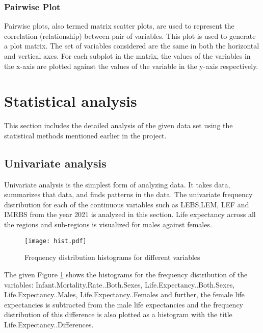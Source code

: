 \documentclass[12 pt]{scrartcl}
\begin{document}
	\subsubsection{Pairwise Plot}
	Pairwise plots, also termed matrix scatter plots, are used to represent the correlation (relationship) between pair of variables. This plot is used to generate a plot matrix. The set of variables considered are the same in both the horizontal and vertical axes. For each subplot in the matrix, the values of the variables in the x-axis are plotted against the values of the variable in the y-axis respectively.
	
	
	
	
	
	
	
	\section{Statistical analysis}
	
	This section includes the detailed analysis of the given data set using the statistical methods mentioned earlier in the project.
	
	\subsection{ Univariate analysis}
	
	Univariate analysis is the simplest form of analyzing data. It takes data, summarizes that data, and finds patterns in the data. The univariate frequency distribution for each of the continuous variables such as LEBS,LEM, LEF and IMRBS from the year 2021 is analyzed in this section. Life expectancy across all the regions and sub-regions is visualized for males against females.
	
	\begin{figure}[h!]
		\centering
		\texttt{[image: hist.pdf]}
		\caption{ Frequency distribution histograms for different variables}
		\label{fig:Histogram}
	\end{figure}
	
	The given Figure \ref{fig:Histogram} shows the histograms for the frequency distribution of the variables: Infant.Mortality.Rate..Both.Sexes, Life.Expectancy..Both.Sexes, Life.Expectancy..Males, Life.Expectancy..Females and further, the female life expectancies is subtracted from the male life expectancies and the frequency distribution of this difference is also plotted as a histogram with the title Life.Expectancy..Differences.
	
\end{document}
